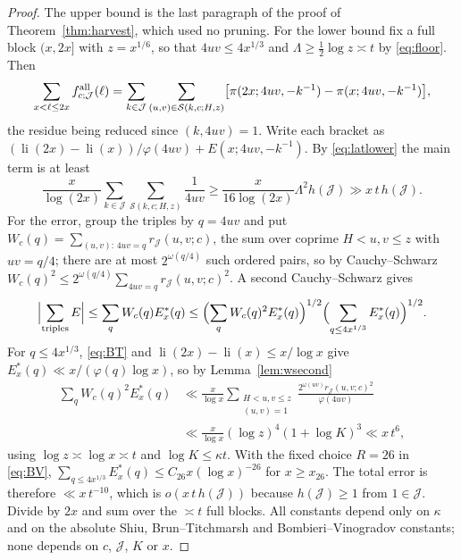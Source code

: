 \documentclass[10pt,reqno]{amsart}
\theoremstyle{remark}
\newcommand{\J}{\mathcal J}
\newcommand{\Sset}{\mathcal S}
\newcommand{\li}{\operatorname{li}}
\begin{document}
\begin{proof}
The upper bound is the last paragraph of the proof of
Theorem~\ref{thm:harvest}, which used no pruning.  For the lower bound
fix a full block $(x,2x]$ with $z=x^{1/6}$, so that $4uv\leq4x^{1/3}$
and $\Lambda\geq\frac12\log z\asymp t$ by \eqref{eq:floor}.  Then
\[
 \sum_{x<\ell\leq2x}f^{\rm all}_{c;\J}(\ell)
 =\sum_{k\in\J}\sum_{(u,v)\in\Sset(k,c;H,z)}
 \bigl[\pi(2x;4uv,-k^{-1})-\pi(x;4uv,-k^{-1})\bigr],
\]
the residue being reduced since $(k,4uv)=1$.  Write each bracket as
$(\li(2x)-\li(x))/\varphi(4uv)+E(x;4uv,-k^{-1})$.  By \eqref{eq:latlower}
the main term is at least
\[
 \frac{x}{\log(2x)}\sum_{k\in\J}\sum_{\Sset(k,c;H,z)}\frac1{4uv}
 \geq\frac{x}{16\log(2x)}\Lambda^2h(\J)\gg x\,t\,h(\J).
\]
For the error, group the triples by $q=4uv$ and put
$W_c(q)=\sum_{(u,v):\,4uv=q}r_{\J}(u,v;c)$, the sum over coprime
$H<u,v\leq z$ with $uv=q/4$; there are at most $2^{\omega(q/4)}$ such
ordered pairs, so by Cauchy--Schwarz
$W_c(q)^2\leq2^{\omega(q/4)}\sum_{4uv=q}r_{\J}(u,v;c)^2$.  A second
Cauchy--Schwarz gives
\[
 \Bigl|\sum_{\rm triples}E\Bigr|\leq\sum_qW_c(q)E^*_x(q)
 \leq\Bigl(\sum_qW_c(q)^2E^*_x(q)\Bigr)^{1/2}
 \Bigl(\sum_{q\leq4x^{1/3}}E^*_x(q)\Bigr)^{1/2}.
\]
For $q\leq4x^{1/3}$, \eqref{eq:BT} and $\li(2x)-\li(x)\leq x/\log x$ give
$E^*_x(q)\ll x/(\varphi(q)\log x)$, so by Lemma~\ref{lem:wsecond}
\[
 \begin{aligned}
 \sum_qW_c(q)^2E^*_x(q)
 &\ll\frac{x}{\log x}
 \sum_{\substack{H<u,v\leq z\\(u,v)=1}}
 \frac{2^{\omega(uv)}r_{\J}(u,v;c)^2}{\varphi(4uv)}\\
 &\ll\frac{x}{\log x}(\log z)^4(1+\log K)^3\ll x\,t^6,
 \end{aligned}
\]
using $\log z\asymp\log x\asymp t$ and $\log K\leq\kappa t$.  With the
fixed choice $R=26$ in \eqref{eq:BV},
$\sum_{q\leq4x^{1/3}}E^*_x(q)\leq C_{26}x(\log x)^{-26}$ for
$x\geq x_{26}$.  The total error is therefore $\ll x\,t^{-10}$, which is
$o(x\,t\,h(\J))$ because $h(\J)\geq1$ from $1\in\J$.  Divide by $2x$ and
sum over the $\asymp t$ full blocks.  All constants depend only on
$\kappa$ and on the absolute Shiu, Brun--Titchmarsh and
Bombieri--Vinogradov constants; none depends on $c$, $\J$, $K$ or $x$.
\end{proof}
\end{document}
